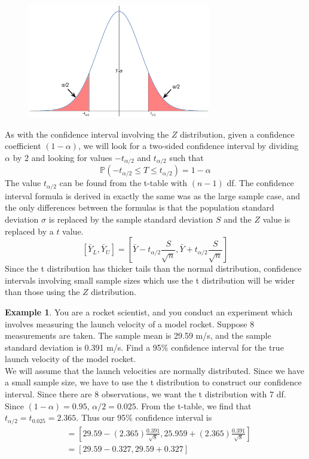 \documentclass[12pt]{article}
\theoremstyle{definition}
\newtheorem*{example}{Example}
\theoremstyle{remark}
\def\P{{\mathbb P}}
\begin{document}
\begin{figure}[H]
\centering
\includegraphics[width=8cm]{tconfidenceinterval.eps}
\end{figure}
As with the confidence interval involving the $Z$ distribution, given a confidence coefficient $(1 - \alpha)$, we will look for a two-sided confidence interval by dividing $\alpha$ by 2 and looking for values $-t_{\alpha/2}$ and $t_{\alpha/2}$ such that
\[
\P(-t_{\alpha/2} \leq T \leq t_{\alpha/2}) = 1 - \alpha
\]
The value $t_{\alpha/2}$ can be found from the t-table with $(n-1)$ df. The confidence interval formula is derived in exactly the same was as the large sample case, and the only differences between the formulas is that the population standard deviation $\sigma$ is replaced by the sample standard deviation $S$ and the $Z$ value is replaced by a $t$ value.
\[
[\bar{Y}_L, \bar{Y}_U] = \left[ \bar{Y} - t_{\alpha/2} \frac{S}{\sqrt{n}}, \bar{Y} + t_{\alpha/2} \frac{S}{\sqrt{n}}\right]
\]
Since the t distribution has thicker tails than the normal distribution, confidence intervals involving small sample sizes which use the t distribution will be wider than those using the $Z$ distribution.

\begin{example}You are a rocket scientist, and you conduct an experiment which involves measuring the launch velocity of a model rocket. Suppose 8 measurements are taken. The sample mean is 29.59 m/s, and the sample standard deviation is 0.391 m/s. Find a 95\% confidence interval for the true launch velocity of the model rocket.\\

We will assume that the launch velocities are normally distributed. Since we have a small sample size, we have to use the t distribution to construct our confidence interval. Since there are 8 observations, we want the t distribution with 7 df. Since $(1 - \alpha) = 0.95$, $\alpha/2 = 0.025$. From the t-table, we find that $t_{\alpha/2} = t_{0.025} = 2.365$. Thus our 95\% confidence interval is
\begin{align*}
[\bar{Y}_L, \bar{Y}_U] &= \left[ 29.59 - (2.365) \frac{0.391}{\sqrt{8}}, 25.959 + (2.365) \frac{0.391}{\sqrt{8}}\right]\\
&= \left[ 29.59 - 0.327, 29.59 + 0.327 \right]
\end{align*}
\end{example}
\end{document}
